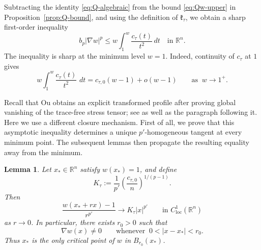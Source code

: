 \documentclass[reqno,12pt]{amsart}
\numberwithin{equation}{section}
\newtheorem{lem}[thm]{Lemma}
\theoremstyle{remark}
\newcommand{\R}{\mathbb R}
\newcommand{\dd}{\,d}
\newcommand{\loc}{\mathrm{loc}}
\begin{document}
Subtracting the  identity \eqref{eq:Q-algebraic} from the bound \eqref{eq:Qw-upper} in Proposition~\ref{prop:Q-bound}, and using the definition of $\mathfrak k_\tau$, we obtain a sharp first-order inequality
\begin{equation}\label{eq:sharp-gradient-w}
b_p|\nabla w|^p \le w\int_1^w\frac{c_\tau(t)}{t^2}\dd t
\quad\text{in }\R^n.
\end{equation}
The inequality is sharp at the minimum level $w=1$.  Indeed,
continuity of $c_\tau$ at $1$ gives
\begin{equation}\label{eq:sharp-gradient-asymptotic}
    w\int_1^w\frac{c_\tau(t)}{t^2}\,\dd t
    = c_{\tau,0}(w-1)+o(w-1)  \qquad\text{as } \ w\to 1^+.
\end{equation}


Recall that Ou obtains an explicit transformed profile after proving global vanishing of the trace-free stress tensor; see
\cite[(3.34)]{O2025} as well as the paragraph following it.
Here we use a different closure mechanism. First of all, we prove that this asymptotic inequality determines a unique $p'$-homogeneous tangent at every minimum point.  The subsequent lemmas then propagate the resulting equality away from the minimum.   

\begin{lem}\label{lem:unique-tangent}
Let $x_*\in\R^n$ satisfy $w(x_*)=1$, and define
\begin{equation}\label{eq:K-tau}
    K_\tau :=\frac1{p'}\left(\frac{c_{\tau,0}}n\right)^{1/(p-1)}.
\end{equation}
Then
\begin{equation}\label{eq:tangent-C1}
    \frac{w(x_*+rx)-1}{r^{p'}} \to K_\tau|x|^{p'} \qquad\text{in }C^1_{\loc}(\R^n)
\end{equation}
as $r\to 0$. In particular, there exists $r_0>0$ such that
$$
\nabla w(x)\ne0 \qquad \text{whenever }\ 0<|x-x_*|<r_0.
$$
Thus $x_*$ is the only critical point of $w$ in $B_{r_0}(x_*)$.
\end{lem}
\end{document}
